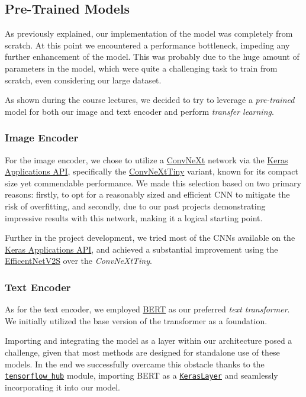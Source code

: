 \documentclass[12pt, a4paper]{article}
\begin{document}
\subsection{Pre-Trained Models}
As previously explained, our implementation of the model was completely from scratch. At this point we encountered a performance bottleneck, impeding any further enhancement of the model. This was probably due to the huge amount of parameters in the model, which were quite a challenging task to train from scratch, even considering our large dataset.

As shown during the course lectures, we decided to try to leverage a \textit{pre-trained} model for both our image and text encoder and perform \textit{transfer learning}.

\subsubsection{Image Encoder}
For the image encoder, we chose to utilize a \href{https://github.com/facebookresearch/ConvNeXt}{ConvNeXt} network via the \href{https://keras.io/api/applications/}{Keras Applications API}, specifically the \href{https://keras.io/api/applications/convnext/#convnexttiny-function}{ConvNeXtTiny} variant, known for its compact size yet commendable performance.
We made this selection based on two primary reasons: firstly, to opt for a reasonably sized and efficient CNN to mitigate the risk of overfitting, and secondly, due to our past projects demonstrating impressive results with this network, making it a logical starting point.

Further in the project development, we tried most of the CNNs available on the \href{https://keras.io/api/applications/}{Keras Applications API}, and achieved a substantial improvement using the \href{https://keras.io/api/applications/efficientnet_v2/#efficientnetv2s-function}{EfficentNetV2S} over the \textit{ConvNeXtTiny}.

\subsubsection{Text Encoder}
As for the text encoder, we employed \href{https://huggingface.co/docs/transformers/model_doc/bert}{BERT} as our preferred \textit{text transformer}.
We initially utilized the base version of the transformer as a foundation.

Importing and integrating the model as a layer within our architecture posed a challenge, given that most methods are designed for standalone use of these models.
In the end we successfully overcame this obstacle thanks to the \href{https://www.tensorflow.org/hub}{\texttt{tensorflow\_hub}} module, importing BERT as a \href{https://www.tensorflow.org/hub/api_docs/python/hub/KerasLayer}{\texttt{KerasLayer}} and seamlessly incorporating it into our model.
\end{document}
